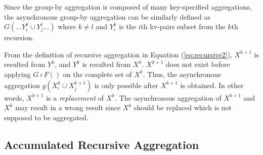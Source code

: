 Since the group-by aggregation is composed of many key-specified aggregations, the asynchronous group-by aggregation can be similarly defined as $G(\ldots Y_{i}^k\cup Y_{j}^{l}\ldots)$ where $k\neq l$ and $Y_i^k$ is the $i$th kv-pairs subset from the $k$th recursion.


From the definition of recursive aggregation in Equation (\ref{eq:recursive2}), $X^{k+1}$ is resulted from $Y^k$, and $Y^k$ is resulted from $X^k$. $X^{k+1}$ does not exist before applying $G\circ F()$ on the complete set of $X^k$. Thus, the asynchronous aggregation $g(X_i^k\cup X_j^{k+1})$ is only possible after $X^{k+1}$ is obtained. In other words, $X^{k+1}$ is a \emph{replacement} of $X^k$. The asynchronous aggregation of $X^{k+1}$ and $X^k$ may result in a wrong result since $X^k$ should be replaced which is not supposed to be aggregated.

\subsection{Accumulated Recursive Aggregation}
\label{sec:async:accrec}

